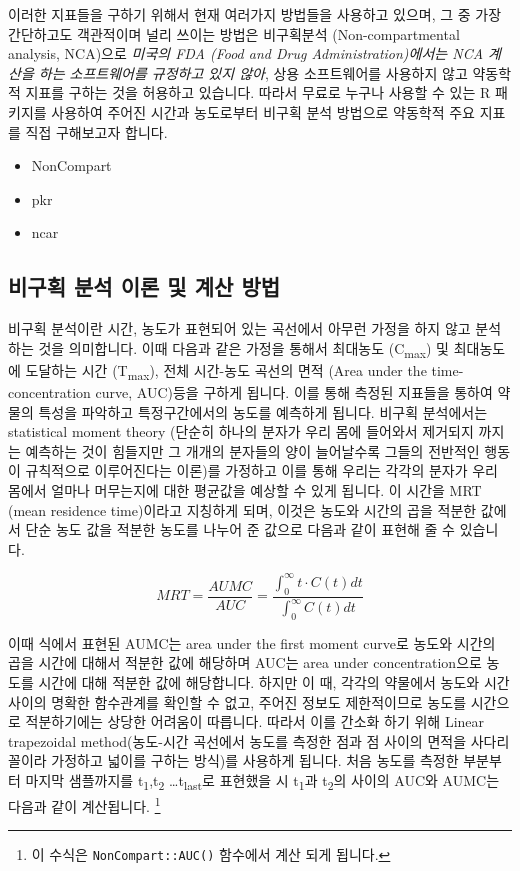 \documentclass[]{krantz}
\providecommand{\tightlist}{%
  \setlength{\itemsep}{0pt}\setlength{\parskip}{0pt}}
\let\rmarkdownfootnote\footnote%
\def\footnote{\protect\rmarkdownfootnote}
\theoremstyle{definition}
\theoremstyle{definition}
\theoremstyle{definition}
\theoremstyle{remark}
\begin{document}
이러한 지표들을 구하기 위해서 현재 여러가지 방법들을 사용하고 있으며, 그
중 가장 간단하고도 객관적이며 널리 쓰이는 방법은 비구획분석
(Non-compartmental analysis, NCA)으로 \emph{미국의 FDA (Food and Drug
Administration)에서는 NCA 계산을 하는 소프트웨어를 규정하고 있지 않아},
상용 소프트웨어를 사용하지 않고 약동학적 지표를 구하는 것을 허용하고
있습니다. 따라서 무료로 누구나 사용할 수 있는 R 패키지를 사용하여 주어진
시간과 농도로부터 비구획 분석 방법으로 약동학적 주요 지표를 직접
구해보고자 합니다.

\begin{itemize}
\tightlist
\item
  NonCompart \citep{R-NonCompart}
\item
  pkr \citep{R-pkr}
\item
  ncar \citep{R-ncar}
\end{itemize}

\subsection{비구획 분석 이론 및 계산 방법}\label{ncar-method}

비구획 분석이란 시간, 농도가 표현되어 있는 곡선에서 아무런 가정을 하지
않고 분석하는 것을 의미합니다. 이때 다음과 같은 가정을 통해서 최대농도
(C\textsubscript{max}) 및 최대농도에 도달하는 시간
(T\textsubscript{max}), 전체 시간-농도 곡선의 면적 (Area under the
time-concentration curve, AUC)등을 구하게 됩니다. 이를 통해 측정된
지표들을 통하여 약물의 특성을 파악하고 특정구간에서의 농도를 예측하게
됩니다. 비구획 분석에서는 statistical moment theory (단순히 하나의
분자가 우리 몸에 들어와서 제거되지 까지는 예측하는 것이 힘들지만 그
개개의 분자들의 양이 늘어날수록 그들의 전반적인 행동이 규칙적으로
이루어진다는 이론)를 가정하고 이를 통해 우리는 각각의 분자가 우리 몸에서
얼마나 머무는지에 대한 평균값을 예상할 수 있게 됩니다. 이 시간을 MRT
(mean residence time)이라고 지칭하게 되며, 이것은 농도와 시간의 곱을
적분한 값에서 단순 농도 값을 적분한 농도를 나누어 준 값으로 다음과 같이
표현해 줄 수 있습니다.

\[
MRT = \frac{AUMC}{AUC} = \frac{\int_{0}^{\infty} t \cdot C(t) dt}{\int_{0}^{\infty} C(t) dt}
\]

이때 식에서 표현된 AUMC는 area under the first moment curve로 농도와
시간의 곱을 시간에 대해서 적분한 값에 해당하며 AUC는 area under
concentration으로 농도를 시간에 대해 적분한 값에 해당합니다. 하지만 이
때, 각각의 약물에서 농도와 시간 사이의 명확한 함수관계를 확인할 수 없고,
주어진 정보도 제한적이므로 농도를 시간으로 적분하기에는 상당한 어려움이
따릅니다. 따라서 이를 간소화 하기 위해 Linear trapezoidal
method(농도-시간 곡선에서 농도를 측정한 점과 점 사이의 면적을
사다리꼴이라 가정하고 넓이를 구하는 방식)를 사용하게 됩니다. 처음 농도를
측정한 부분부터 마지막 샘플까지를 t\textsubscript{1},t\textsubscript{2}
\ldots{}t\textsubscript{last}로 표현했을 시 t\textsubscript{1}과
t\textsubscript{2}의 사이의 AUC와 AUMC는 다음과 같이 계산됩니다.
\footnote{이 수식은 \texttt{NonCompart::AUC()} 함수에서 계산 되게
  됩니다.}
\end{document}
